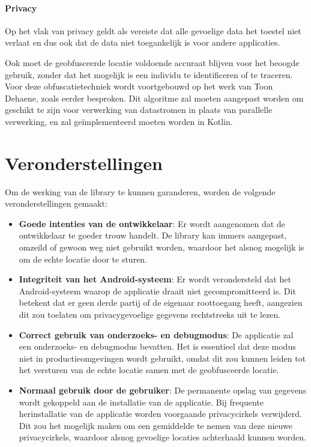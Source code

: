 \paragraph{Privacy} Op het vlak van privacy geldt als vereiste dat alle gevoelige data het toestel niet verlaat en dus ook dat de data niet toegankelijk is voor andere applicaties.

Ook moet de geobfusceerde locatie voldoende accuraat blijven voor het beoogde gebruik, zonder dat het mogelijk is een individu te identificeren of te traceren.
Voor deze obfuscatietechniek wordt voortgebouwd op het werk van Toon Dehaene, zoals eerder besproken. Dit algoritme zal moeten aangepast worden om geschikt te zijn voor verwerking van datastromen in plaats van parallelle verwerking, en zal geïmplementeerd moeten worden in Kotlin.
\section{Veronderstellingen}
Om de werking van de library te kunnen garanderen, worden de volgende veronderstellingen gemaakt:
\begin{itemize}
    \item \textbf{Goede intenties van de ontwikkelaar}: Er wordt aangenomen dat de ontwikkelaar te goeder trouw handelt. De library kan immers aangepast, omzeild of gewoon weg niet gebruikt worden, waardoor het alsnog mogelijk is om de echte locatie door te sturen.
    \item \textbf{Integriteit van het Android-systeem}: Er wordt verondersteld dat het Android-systeem waarop de applicatie draait niet gecompromitteerd is. Dit betekent dat er geen derde partij of de eigenaar roottoegang heeft, aangezien dit zou toelaten om privacygevoelige gegevens rechtstreeks uit te lezen.
    \item \textbf{Correct gebruik van onderzoeks- en debugmodus}: De applicatie zal een onderzoeks- en debugmodus bevatten. Het is essentieel dat deze modus niet in productieomgevingen wordt gebruikt, omdat dit zou kunnen leiden tot het versturen van de echte locatie samen met de geobfusceerde locatie.
    \item \textbf{Normaal gebruik door de gebruiker}: De permanente opslag van gegevens wordt gekoppeld aan de installatie van de applicatie. Bij frequente herinstallatie van de applicatie worden voorgaande privacycirkels verwijderd. Dit zou het mogelijk maken om een gemiddelde te nemen van deze nieuwe privacycirkels, waardoor alsnog gevoelige locaties achterhaald kunnen worden.
\end{itemize}
